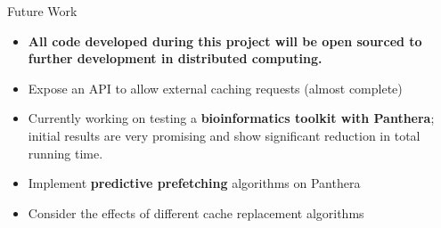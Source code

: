 \documentclass[final]{beamer} %
\begin{document}
\begin{frame}
\begin{columns}[t]
\begin{column}{0.32\textwidth}
	\begin{block}{Future Work}
	\begin{itemize}
		\item \textbf{All code developed during this project will be open sourced to further development in distributed computing.}
		\item Expose an API to allow external caching requests (almost complete)
		\item Currently working on testing a \textbf{bioinformatics toolkit with Panthera}; initial results are very promising and show significant reduction in total running time.
		\item Implement \textbf{predictive prefetching} algorithms on Panthera
		\item Consider the effects of different cache replacement algorithms
		
	\end{itemize}
	\end{block}
      \end{column}
    \end{columns}
  \end{frame}
    
  
\end{document}
